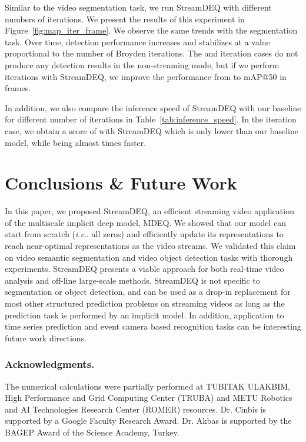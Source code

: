 \documentclass[runningheads]{llncs}
\makeatletter
\DeclareRobustCommand\onedot{\futurelet\@let@token\@onedot}
\def\@onedot{\ifx\@let@token.\else.\null\fi\xspace}
\def\ie{\emph{i.e}\onedot} \def\Ie{\emph{I.e}\onedot}
\makeatother
\begin{document}
Similar to the video segmentation task, we run StreamDEQ with different numbers of iterations. We present the results of this experiment in Figure~\ref{fig:map_iter_frame}. We observe the same trends with the segmentation task. Over time, detection performance increases and stabilizes at a value proportional to the number of Broyden iterations. The  and  iteration cases do not produce any detection results in the non-streaming mode, but if we perform  iterations with StreamDEQ, we improve the performance from  to  mAP@50 in  frames. 


In addition, we also compare the inference speed of StreamDEQ with our baseline for different number of iterations in Table~\ref{tab:inference_speed}. In the  iteration case, we obtain a score of  with StreamDEQ which is only  lower than our baseline model, while being almost  times faster.


\section{Conclusions \& Future Work}


In this paper, we proposed StreamDEQ, an efficient streaming video application of the multiscale implicit deep model, MDEQ. We showed that our model can start from scratch (\ie all zeros) and efficiently update its representations to reach near-optimal representations as the video streams. We validated this claim on video semantic segmentation and video object detection tasks with thorough experiments. StreamDEQ presents a viable approach for both  real-time video analysis and off-line large-scale methods. StreamDEQ is not specific to segmentation or object detection, and can be used as a drop-in replacement for most other structured prediction problems on streaming videos as long as the prediction task is performed by an implicit model. In addition, application to time series prediction and event camera based recognition tasks can be interesting future work directions.


\subsubsection{Acknowledgments.}


The numerical calculations were partially performed at TUBITAK ULAKBIM, High Performance and Grid Computing Center (TRUBA) and METU Robotics and AI Technologies Research Center (ROMER) resources. Dr. Cinbis is supported by a Google Faculty Research Award. Dr. Akbas is supported by the BAGEP Award of the Science Academy, Turkey.




\par\vfill\par


\clearpage


\end{document}
